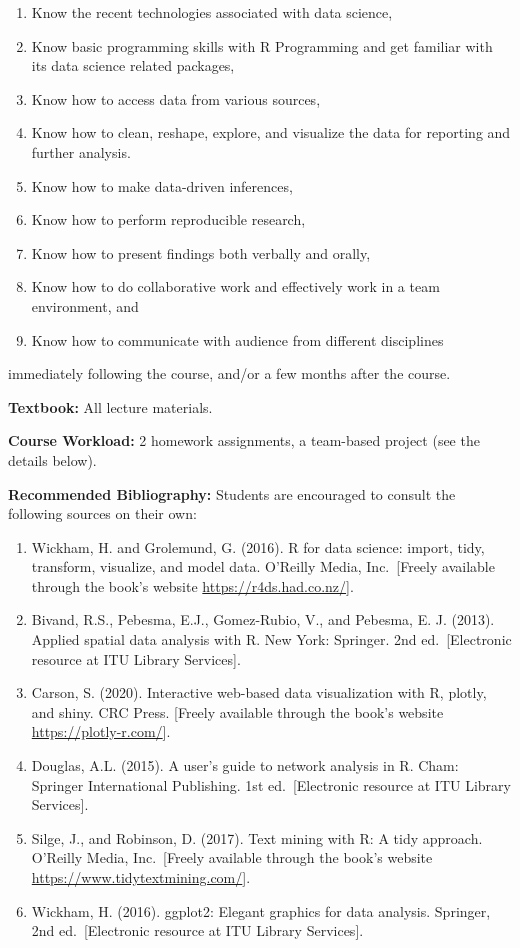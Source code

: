 \documentclass[
  12pt,
]{article}
\providecommand{\tightlist}{%
  \setlength{\itemsep}{0pt}\setlength{\parskip}{0pt}}
\begin{document}
\begin{enumerate}
\def\labelenumi{\arabic{enumi}.}
\tightlist
\item
  Know the recent technologies associated with data science,
\item
  Know basic programming skills with R Programming and get familiar with
  its data science related packages,
\item
  Know how to access data from various sources,
\item
  Know how to clean, reshape, explore, and visualize the data for
  reporting and further analysis.
\item
  Know how to make data-driven inferences,
\item
  Know how to perform reproducible research,
\item
  Know how to present findings both verbally and orally,
\item
  Know how to do collaborative work and effectively work in a team
  environment, and
\item
  Know how to communicate with audience from different disciplines
\end{enumerate}

immediately following the course, and/or a few months after the course.

\textbf{Textbook:} All lecture materials.

\textbf{Course Workload:} 2 homework assignments, a team-based project
(see the details below).

\textbf{Recommended Bibliography:} Students are encouraged to consult
the following sources on their own:

\begin{enumerate}
\def\labelenumi{\arabic{enumi}.}
\item
  Wickham, H. and Grolemund, G. (2016). R for data science: import,
  tidy, transform, visualize, and model data. O'Reilly Media,
  Inc.~{[}Freely available through the book's website
  \url{https://r4ds.had.co.nz/}{]}.
\item
  Bivand, R.S., Pebesma, E.J., Gomez-Rubio, V., and Pebesma, E. J.
  (2013). Applied spatial data analysis with R. New York: Springer. 2nd
  ed.~{[}Electronic resource at ITU Library Services{]}.
\item
  Carson, S. (2020). Interactive web-based data visualization with R,
  plotly, and shiny. CRC Press. {[}Freely available through the book's
  website \url{https://plotly-r.com/}{]}.
\item
  Douglas, A.L. (2015). A user's guide to network analysis in R. Cham:
  Springer International Publishing. 1st ed.~{[}Electronic resource at
  ITU Library Services{]}.
\item
  Silge, J., and Robinson, D. (2017). Text mining with R: A tidy
  approach. O'Reilly Media, Inc.~{[}Freely available through the book's
  website \url{https://www.tidytextmining.com/}{]}.
\item
  Wickham, H. (2016). ggplot2: Elegant graphics for data analysis.
  Springer, 2nd ed.~{[}Electronic resource at ITU Library Services{]}.
\end{enumerate}
\end{document}
